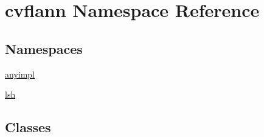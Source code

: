 \hypertarget{namespacecvflann}{\section{cvflann Namespace Reference}
\label{namespacecvflann}
}
\subsection*{Namespaces}
\begin{DoxyCompactItemize}
\item 
\hyperlink{namespacecvflann_1_1anyimpl}{anyimpl}
\item 
\hyperlink{namespacecvflann_1_1lsh}{lsh}
\end{DoxyCompactItemize}
\subsection*{Classes}

